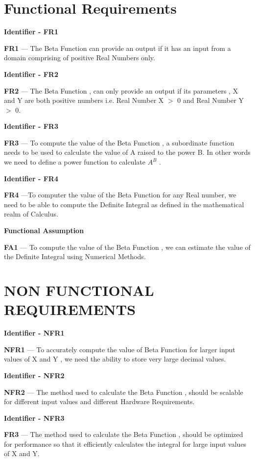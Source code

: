 \documentclass[12pt,letterpaper]{article}
\begin{document}
\section*{Functional Requirements}

\textbf{Identifier - FR1}

\textbf{FR1} --- The Beta Function can provide an output if it has an input from a domain comprising of positive Real Numbers only.

\textbf{Identifier - FR2}

\textbf{FR2} --- The Beta Function , can only provide an output if its parameters , X and Y are both positive numbers i.e. Real Number X $>$ 0 and Real Number Y $>$ 0.

\textbf{Identifier - FR3}

\textbf{FR3} --- To compute the value of the Beta Function , a subordinate function needs to be used to calculate the value of A raised to the power B. In other words we need to define a power function to calculate $A^B$ .

\textbf{Identifier - FR4}

\textbf{FR4} ---To computer the value of the Beta Function for any Real number, we need to be able to compute the Definite Integral as defined in the mathematical realm of Calculus. \newline


\textbf{Functional Assumption}

\textbf{FA1} --- To compute the value of the Beta Function , we can estimate the value of the Definite Integral using Numerical Methods.

\section*{NON FUNCTIONAL REQUIREMENTS}
\textbf{Identifier - NFR1}

\textbf{NFR1} --- To accurately compute the value of Beta Function for larger input values of X and Y , we need the ability to store very large decimal values.

\textbf{Identifier - NFR2}

\textbf{NFR2} --- The method used to calculate the Beta Function , should be scalable for different input values and different Hardware Requirements.

\textbf{Identifier - NFR3}

\textbf{FR3} --- The method used to calculate the Beta Function , should be optimized for performance so that it efficiently calculates the integral for large input values of  X and Y.
\end{document}
